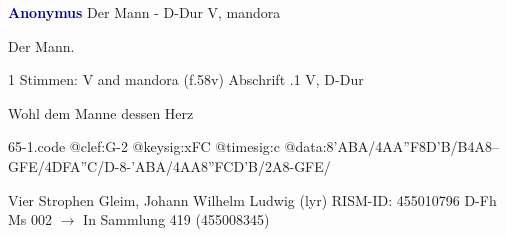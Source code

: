 \documentclass[twocolumn]{book}
\begin{document}
\newline \par \vspace{7pt} \textcolor{darkblue}{\textbf{Anonymus  }}
\newline Der Mann - D-Dur
\newline V, mandora
\newline \begin{itshape}[heading, f.58v:] Der Mann.\end{itshape} 
\newline \textcolor{darkblue}{}  1 Stimmen: V and mandora  (f.58v)
\newline Abschrift
.1  V, D-Dur
\newline \begin{footnotesize} Wohl dem Manne dessen Herz \end{footnotesize}  
\begin{filecontents*}{65-1.code}
@clef:G-2
@keysig:xFC
@timesig:c
@data:8'ABA/4AA''F8D'B/B4A8--GFE/4DFA''C/D-8-'ABA/4AA{8''FC}{D'B}/2A8-GFE/
\end{filecontents*}
\newline
%
\newline Vier Strophen
\newline Gleim, Johann Wilhelm Ludwig  (lyr)
\newline RISM-ID: 455010796
\newline D-Fh  Ms 002
\newline $\rightarrow$ In Sammlung 419 (455008345)
      
\end{document}
